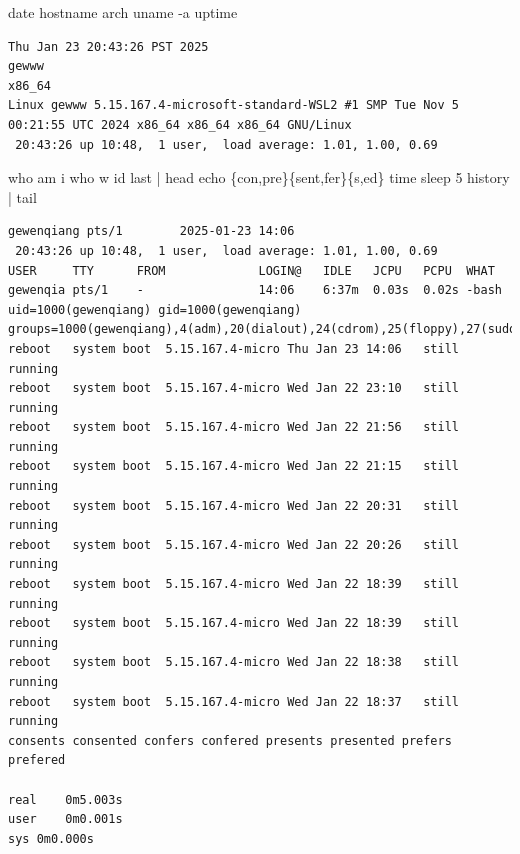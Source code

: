 \documentclass[
]{article}
\newenvironment{Shaded}{\begin{snugshade}}{\end{snugshade}}
\newcommand{\AttributeTok}[1]{\textcolor[rgb]{0.40,0.45,0.13}{#1}}
\newcommand{\BuiltInTok}[1]{\textcolor[rgb]{0.00,0.23,0.31}{#1}}
\newcommand{\DataTypeTok}[1]{\textcolor[rgb]{0.68,0.00,0.00}{#1}}
\newcommand{\FunctionTok}[1]{\textcolor[rgb]{0.28,0.35,0.67}{#1}}
\newcommand{\KeywordTok}[1]{\textcolor[rgb]{0.00,0.23,0.31}{#1}}
\newcommand{\NormalTok}[1]{\textcolor[rgb]{0.00,0.23,0.31}{#1}}
\newcommand{\OperatorTok}[1]{\textcolor[rgb]{0.37,0.37,0.37}{#1}}
\begin{document}
\begin{Shaded}
\begin{Highlighting}[]
\FunctionTok{date}
\FunctionTok{hostname}
\FunctionTok{arch}
\FunctionTok{uname} \AttributeTok{{-}a}
\FunctionTok{uptime}
\end{Highlighting}
\end{Shaded}

\begin{verbatim}
Thu Jan 23 20:43:26 PST 2025
gewww
x86_64
Linux gewww 5.15.167.4-microsoft-standard-WSL2 #1 SMP Tue Nov 5 00:21:55 UTC 2024 x86_64 x86_64 x86_64 GNU/Linux
 20:43:26 up 10:48,  1 user,  load average: 1.01, 1.00, 0.69
\end{verbatim}

\begin{Shaded}
\begin{Highlighting}[]
\FunctionTok{who}\NormalTok{ am i}
\FunctionTok{who}
\FunctionTok{w}
\FunctionTok{id}
\FunctionTok{last} \KeywordTok{|} \FunctionTok{head}
\BuiltInTok{echo} \DataTypeTok{\{con}\OperatorTok{,}\DataTypeTok{pre\}\{sent}\OperatorTok{,}\DataTypeTok{fer\}\{s}\OperatorTok{,}\DataTypeTok{ed\}}
\BuiltInTok{time}\NormalTok{ sleep 5}
\BuiltInTok{history} \KeywordTok{|} \FunctionTok{tail}
\end{Highlighting}
\end{Shaded}

\begin{verbatim}
gewenqiang pts/1        2025-01-23 14:06
 20:43:26 up 10:48,  1 user,  load average: 1.01, 1.00, 0.69
USER     TTY      FROM             LOGIN@   IDLE   JCPU   PCPU  WHAT
gewenqia pts/1    -                14:06    6:37m  0.03s  0.02s -bash
uid=1000(gewenqiang) gid=1000(gewenqiang) groups=1000(gewenqiang),4(adm),20(dialout),24(cdrom),25(floppy),27(sudo),29(audio),30(dip),44(video),46(plugdev),100(users),107(netdev)
reboot   system boot  5.15.167.4-micro Thu Jan 23 14:06   still running
reboot   system boot  5.15.167.4-micro Wed Jan 22 23:10   still running
reboot   system boot  5.15.167.4-micro Wed Jan 22 21:56   still running
reboot   system boot  5.15.167.4-micro Wed Jan 22 21:15   still running
reboot   system boot  5.15.167.4-micro Wed Jan 22 20:31   still running
reboot   system boot  5.15.167.4-micro Wed Jan 22 20:26   still running
reboot   system boot  5.15.167.4-micro Wed Jan 22 18:39   still running
reboot   system boot  5.15.167.4-micro Wed Jan 22 18:39   still running
reboot   system boot  5.15.167.4-micro Wed Jan 22 18:38   still running
reboot   system boot  5.15.167.4-micro Wed Jan 22 18:37   still running
consents consented confers confered presents presented prefers prefered

real    0m5.003s
user    0m0.001s
sys 0m0.000s
\end{verbatim}
\end{document}
